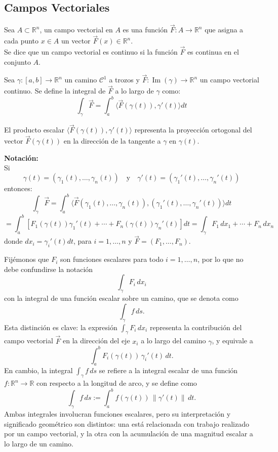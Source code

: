 \subsection{Campos Vectoriales}

\begin{definición} 
Sea $A \subset \mathbb{R}^n$, un campo vectorial en $A$ es una función $\vec{F} : A \to \mathbb{R}^n$ que asigna a cada punto $x \in A$ un vector $\vec{F}(x) \in \mathbb{R}^n$.\\
Se dice que un campo vectorial es continuo si la función $\vec{F}$ es continua en el conjunto $A$.
\end{definición}
\begin{definición} 
Sea $\gamma : [a, b] \to \mathbb{R}^n$ un camino $\mathcal{C}^1$ a trozos y $\vec{F} : \operatorname{Im}(\gamma) \to \mathbb{R}^n$ un campo vectorial continuo. Se define la integral de $\vec{F}$ a lo largo de $\gamma$ como:
\[
    \int_\gamma \vec{F} = \int_a^b \langle \vec{F}(\gamma(t)), \gamma'(t) \rangle dt
\]
\end{definición}

\begin{observación}
El producto escalar $\langle \vec{F}(\gamma(t)), \gamma'(t) \rangle$ representa la proyección ortogonal del vector $\vec{F}(\gamma(t))$ en la dirección de la tangente a $\gamma \text{ en } \gamma(t)$.

\end{observación}

\textbf{Notación:}\\
Si
\[
    \gamma(t) = (\gamma_1(t), \ldots, \gamma_n(t)) \quad \text{y} \quad \gamma'(t) = (\gamma_1'(t), \ldots, \gamma_n'(t))
\]
entonces:
\[
    \int_\gamma \vec{F} = \int_a^b \langle \vec{F}(\gamma_1(t), \ldots, \gamma_n(t)), (\gamma_1'(t), \ldots, \gamma_n'(t)) \rangle dt
\]
\[
    = \int_a^b \left[ F_1(\gamma(t)) \gamma_1'(t) + \cdots + F_n(\gamma(t)) \gamma_n'(t) \right] dt = \int_\gamma F_1 \, dx_1 + \cdots + F_n \, dx_n
\]
donde $dx_i = \gamma_i'(t) dt$, para $i = 1, \ldots, n$ y $\vec{F} = (F_1, \ldots,
    F_n)$.

\medskip

Fijémonos que $F_i$ son funciones escalares para todo $i = 1, \ldots, n$, por lo que no debe confundirse la notación 
\[
    \int_\gamma F_i \, dx_i
\]
con la integral de una función escalar sobre un camino, que se denota como
\[
    \int_\gamma f \, ds.
\]
Esta distinción es clave: la expresión $\int_\gamma F_i \, dx_i$ representa la contribución del campo vectorial $\vec{F}$ en la dirección del eje $x_i$ a lo largo del camino $\gamma$, y equivale a
\[
    \int_a^b F_i(\gamma(t)) \, \gamma_i'(t) \, dt.
\]
En cambio, la integral $\int_\gamma f \, ds$ se refiere a la integral escalar de una función $f : \mathbb{R}^n \to \mathbb{R}$ con respecto a la longitud de arco, y se define como
\[
    \int_\gamma f \, ds := \int_a^b f(\gamma(t)) \, \lVert \gamma'(t) \rVert \, dt.
\]
Ambas integrales involucran funciones escalares, pero su interpretación y significado geométrico son distintos: una está relacionada con trabajo realizado por un campo vectorial, y la otra con la acumulación de una magnitud escalar a lo largo de un camino.
    

